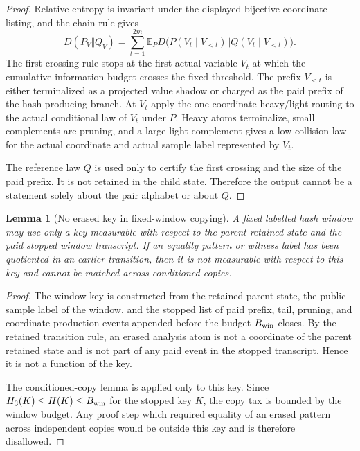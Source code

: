 \documentclass[11pt]{article}
\newtheorem{lemma}[theorem]{Lemma}
\theoremstyle{remark}
\newcommand{\E}{\mathbb E}
\begin{document}
\begin{proof}
Relative entropy is invariant under the displayed bijective coordinate listing, and the chain rule gives
\[
        D(P_V\Vert Q_V)=\sum_{t=1}^{2m}\E_P D\bigl(P(V_t\mid V_{<t})\Vert Q(V_t\mid V_{<t})\bigr).
\]
The first-crossing rule stops at the first actual variable $V_t$ at which the cumulative information budget crosses the fixed threshold.  The prefix $V_{<t}$ is either terminalized as a projected value shadow or charged as the paid prefix of the hash-producing branch.  At $V_t$ apply the one-coordinate heavy/light routing to the actual conditional law of $V_t$ under $P$.  Heavy atoms terminalize, small complements are pruning, and a large light complement gives a low-collision law for the actual coordinate and actual sample label represented by $V_t$.

The reference law $Q$ is used only to certify the first crossing and the size of the paid prefix.  It is not retained in the child state.  Therefore the output cannot be a statement solely about the pair alphabet or about $Q$.
\end{proof}

\begin{lemma}[No erased key in fixed-window copying]\label{lem:crit-no-erased-key}
A fixed labelled hash window may use only a key measurable with respect to the parent retained state and the paid stopped window transcript.  If an equality pattern or witness label has been quotiented in an earlier transition, then it is not measurable with respect to this key and cannot be matched across conditioned copies.
\end{lemma}

\begin{proof}
The window key is constructed from the retained parent state, the public sample label of the window, and the stopped list of paid prefix, tail, pruning, and coordinate-production events appended before the budget $B_{\rm win}$ closes.  By the retained transition rule, an erased analysis atom is not a coordinate of the parent retained state and is not part of any paid event in the stopped transcript.  Hence it is not a function of the key.

The conditioned-copy lemma is applied only to this key.  Since $H_3(K)\le H(K)\le B_{\rm win}$ for the stopped key $K$, the copy tax is bounded by the window budget.  Any proof step which required equality of an erased pattern across independent copies would be outside this key and is therefore disallowed.
\end{proof}
\end{document}

